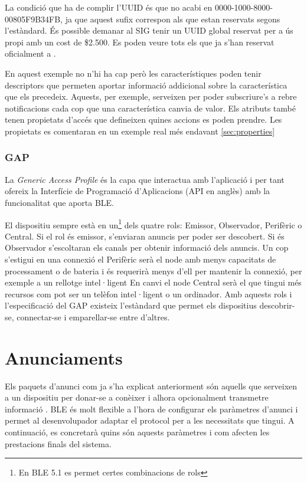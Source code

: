 La condició que ha de complir l'UUID és que no acabi en 0000-1000-8000-00805F9B34FB, ja que aquest sufix correspon als que estan reservats segons l'estàndard.
És possible demanar al SIG tenir un UUID global reservat per a ús propi amb un cost de \$2.500.
Es poden veure tots els que ja s'han reservat oficialment a \cite{reservedUUIDs}.

En aquest exemple no n'hi ha cap però les característiques poden tenir descriptors \cite{descriptors} que permeten aportar informació addicional sobre la característica que els precedeix.
Aquests, per exemple, serveixen per poder subscriure's a rebre notificacions cada cop que una característica canvia de valor.
Els atributs també tenen propietats d'accés que defineixen quines accions es poden prendre.
Les propietats es comentaran en un exemple real més endavant \ref{sec:properties}

\subsubsection{GAP}
\label{GAP}
La \textit{Generic Access Profile} és la capa que interactua amb l'aplicació i per tant ofereix la Interfície de Programació d'Aplicacions (API en anglès) amb la funcionalitat que aporta BLE.

El dispositiu sempre està en un\footnote{En BLE 5.1 es permet certes combinacions de rols} dels quatre rols: Emissor, Observador, Perifèric o Central.
Si el rol és emissor, s'enviaran anuncis per poder ser descobert.
Si és Observador s'escoltaran els canals per obtenir informació dels anuncis.
Un cop s'estigui en una connexió el Perifèric serà el node amb menys capacitats de processament o de bateria i és requerirà menys d'ell per mantenir la connexió, per exemple a un rellotge intel·ligent
En canvi el node Central serà el que tingui més recursos com pot ser un telèfon intel·ligent o un ordinador.
Amb aquests rols i l'especificació del GAP existeix l'estàndard que permet els dispositius descobrir-se, connectar-se i emparellar-se entre d'altres.


\section{Anunciaments}
Els paquets d'anunci com ja s'ha explicat anteriorment són aquells que serveixen a un dispositiu per donar-se a conèixer i alhora opcionalment transmetre informació \cite{Advertising}.
BLE és molt flexible a l'hora de configurar els paràmetres d'anunci i permet al desenvolupador adaptar el protocol per a les necessitats que tingui.
A continuació, es concretarà quins són aquests paràmetres i com afecten les prestacions finals del sistema.


